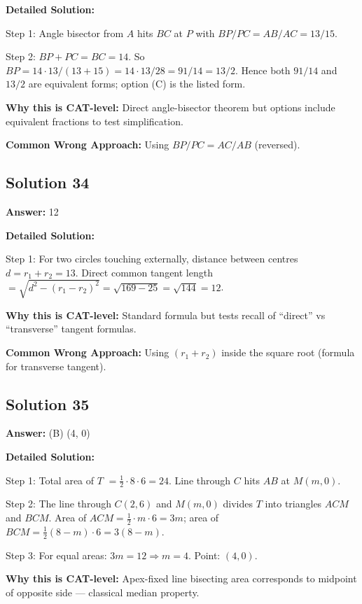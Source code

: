 \documentclass[11pt]{article}
\begin{document}
\textbf{Detailed Solution:}

Step 1: Angle bisector from \(A\) hits \(BC\) at \(P\) with \(BP/PC = AB/AC = 13/15\).

Step 2: \(BP + PC = BC = 14\). So \(BP = 14 \cdot 13/(13+15) = 14 \cdot 13/28 = 91/14 = 13/2\). Hence both \(91/14\) and \(13/2\) are equivalent forms; option (C) is the listed form.

\textbf{Why this is CAT-level:} Direct angle-bisector theorem but options include equivalent fractions to test simplification.

\textbf{Common Wrong Approach:} Using \(BP/PC = AC/AB\) (reversed).

\subsection*{Solution 34}
\textbf{Answer:} 12

\textbf{Detailed Solution:}

Step 1: For two circles touching externally, distance between centres \(d = r_1 + r_2 = 13\). Direct common tangent length \(= \sqrt{d^2 - (r_1 - r_2)^2} = \sqrt{169 - 25} = \sqrt{144} = 12\).

\textbf{Why this is CAT-level:} Standard formula but tests recall of ``direct'' vs ``transverse'' tangent formulas.

\textbf{Common Wrong Approach:} Using \((r_1+r_2)\) inside the square root (formula for transverse tangent).

\subsection*{Solution 35}
\textbf{Answer:} (B) (4, 0)

\textbf{Detailed Solution:}

Step 1: Total area of \(T\) \(= \tfrac{1}{2}\cdot 8 \cdot 6=24\). Line through \(C\) hits \(AB\) at \(M(m,0)\).

Step 2: The line through \(C(2,6)\) and \(M(m,0)\) divides \(T\) into triangles \(ACM\) and \(BCM\). Area of \(ACM=\tfrac12 \cdot m \cdot 6=3m\); area of \(BCM=\tfrac12 (8-m)\cdot 6=3(8-m)\).

Step 3: For equal areas: \(3m=12 \Rightarrow m=4\). Point: \((4,0)\).

\textbf{Why this is CAT-level:} Apex-fixed line bisecting area corresponds to midpoint of opposite side — classical median property.
\end{document}
